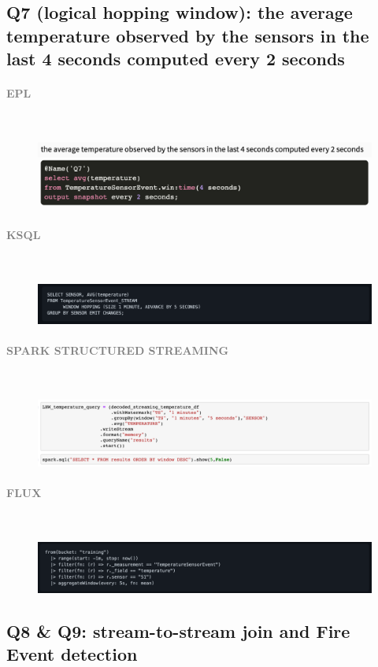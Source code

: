\documentclass[10pt,a4paper]{article}
\newcommand{\myparagraph}[1]{\paragraph{\normalsize{\textcolor{gray}{\uppercase{\textbf{#1}}}} }\mbox{} \vspace{0.5em}\\}
\begin{document}
\pagebreak

\subsection{Q7 (logical hopping window): the average temperature observed by the sensors in the last 4 seconds computed every 2 seconds}

\myparagraph{EPL}
\begin{figure}[h!]
 \hfill \includegraphics[width=400pt]{images/epl_Q7}\hspace*{\fill}
\end{figure}
\myparagraph{KSQL}
\begin{figure}[h!]
 \hfill \includegraphics[width=400pt]{images/ksql_Q7}\hspace*{\fill}
\end{figure}
\myparagraph{Spark Structured Streaming}
\begin{figure}[h!]
 \hfill \includegraphics[width=400pt]{images/sss_Q7}\hspace*{\fill}
\end{figure}
\myparagraph{Flux}
\begin{figure}[h!]
 \hfill \includegraphics[width=400pt]{images/flux_Q7}\hspace*{\fill}
\end{figure}

\pagebreak

\subsection{Q8 \& Q9: stream-to-stream join and Fire Event detection}
\end{document}
